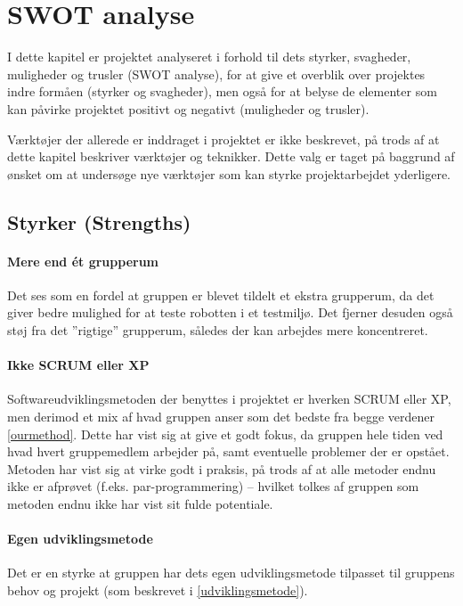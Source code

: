 \section{SWOT analyse}\label{swot:analyse}
I dette kapitel er projektet analyseret i forhold til dets styrker, svagheder, muligheder og trusler (SWOT analyse), for at give et overblik over projektes indre formåen (styrker og svagheder), men også for at belyse de elementer som kan påvirke projektet positivt og negativt (muligheder og trusler).

Værktøjer der allerede er inddraget i projektet er ikke beskrevet, på trods af at dette kapitel beskriver værktøjer og teknikker.
Dette valg er taget på baggrund af ønsket om at undersøge nye værktøjer som kan styrke projektarbejdet yderligere.

\subsection{Styrker \textnormal{(\textbf{S}trengths)}}

\paragraph{Mere end ét grupperum}
Det ses som en fordel at gruppen er blevet tildelt et ekstra grupperum, da det giver bedre mulighed for at teste robotten i et testmiljø.
Det fjerner desuden også støj fra det ''rigtige'' grupperum, således der kan arbejdes mere koncentreret.

\paragraph{Ikke SCRUM eller XP}
Softwareudviklingsmetoden der benyttes i projektet er hverken SCRUM eller XP, men derimod et mix af hvad gruppen anser som det bedste fra begge verdener \cref{ourmethod}.
Dette har vist sig at give et godt fokus, da gruppen hele tiden ved hvad hvert gruppemedlem arbejder på, samt eventuelle problemer der er opstået.
Metoden har vist sig at virke godt i praksis, på trods af at alle metoder endnu ikke er afprøvet (f.eks. par-programmering) -- hvilket tolkes af gruppen som metoden endnu ikke har vist sit fulde potentiale.

\paragraph{Egen udviklingsmetode}
Det er en styrke at gruppen har dets egen udviklingsmetode tilpasset til gruppens behov og projekt (som beskrevet i \cref{udviklingsmetode}).

